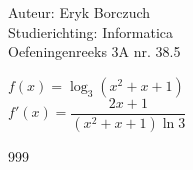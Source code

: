 \documentclass[a4paper]{article}
\begin{document}
  
\noindent \large Auteur: Eryk Borczuch \\
\noindent \large Studierichting: Informatica\\
\noindent \large Oefeningenreeks 3A nr. 38.5\\

\medskip

\normalsize

$f(x) = \log_3 (x^2+x+1)$\\

$f'(x) = \dfrac{2x+1}{(x^2+x+1) \ln 3}$\\

\begin{thebibliography}{999}
\end{thebibliography}
\end{document}
